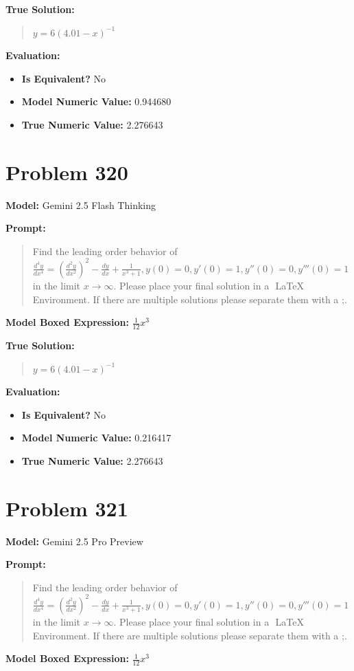 \documentclass{article}
\begin{document}
{\textbf{True Solution:}
\begin{quote}
$y=6(4.01-x)^{-1}$
\end{quote}

\textbf{Evaluation:}
\begin{itemize}
\item \textbf{Is Equivalent?} No
\item \textbf{Model Numeric Value:} 0.944680
\item \textbf{True Numeric Value:} 2.276643
\end{itemize}
\vspace{1cm}
\section*{Problem 320}
\textbf{Model:} Gemini 2.5 Flash Thinking

\textbf{Prompt:}
\begin{quote}
Find the leading order behavior of $\frac{d^4 y}{dx^4} = (\frac{d^2 y}{dx^2})^2 - \frac{d y}{dx}+ \frac{1}{x^3+1}, y(0)=0, y'(0)=1, y''(0)=0, y'''(0)=1$ in the limit $ x \rightarrow \infty$. Please place your final solution in a $\boxed{}$ LaTeX Environment. If there are multiple solutions please separate them with a ;.
\end{quote}
\textbf{Model Boxed Expression:} $\frac{1}{12}x^3$

\textbf{True Solution:}
\begin{quote}
$y=6(4.01-x)^{-1}$
\end{quote}

\textbf{Evaluation:}
\begin{itemize}
\item \textbf{Is Equivalent?} No
\item \textbf{Model Numeric Value:} 0.216417
\item \textbf{True Numeric Value:} 2.276643
\end{itemize}
\vspace{1cm}
\section*{Problem 321}
\textbf{Model:} Gemini 2.5 Pro Preview

\textbf{Prompt:}
\begin{quote}
Find the leading order behavior of $\frac{d^4 y}{dx^4} = (\frac{d^2 y}{dx^2})^2 - \frac{d y}{dx}+ \frac{1}{x^3+1}, y(0)=0, y'(0)=1, y''(0)=0, y'''(0)=1$ in the limit $ x \rightarrow \infty$. Please place your final solution in a $\boxed{}$ LaTeX Environment. If there are multiple solutions please separate them with a ;.
\end{quote}
\textbf{Model Boxed Expression:} $\frac{1}{12}x^3$

}
\end{document}
